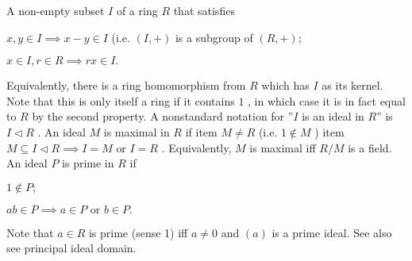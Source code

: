 A non-empty subset  $ I $  of a ring  $ R $  that satisfies
   \par
  $ x,y \in I \implies x-y \in I $  (i.e.   $ (I,+) $  is a subgroup of  $ (R,+)  ;$ 
   \par
  $ x \in I, r \in R \implies rx \in I  . $ 
\par
Equivalently, there is a ring homomorphism from $ R $ which has $ I $
 as its kernel.  Note that this is only itself a ring if it contains $1$ , in which case it is in fact equal to $ R $ by the second
 property.  A nonstandard notation for ''$ I $ is an ideal in $ R $''
 is $ I \triangleleft R $ .
An ideal  $ M $  is  maximal in  $ R $  if
   item  $ M \neq R $  (i.e. $ 1 \notin M $ )
   item  $ M \subseteq I \triangleleft R  \implies I=M  \text{ or } I=R $ .
Equivalently,  $ M $  is maximal iff  $ R/M $  is a field.
An ideal  $ P $  is  prime in  $ R $  if
   \par
  $ 1 \notin P  ; $ 
   \par
  $ ab \in P \implies a \in P  \text{ or } b \in P . $
\par
Note that  $ a \in R $  is prime (sense 1) iff  $ a \neq 0 $  and  $ (a) $ 
is a prime ideal.
See also see principal ideal domain.